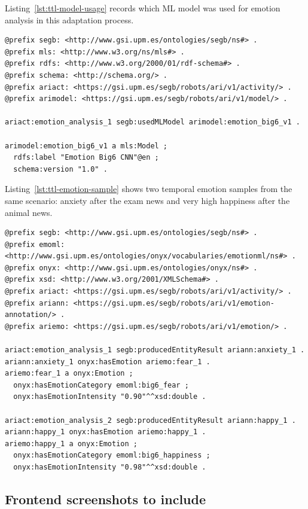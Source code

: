 \documentclass[preprint,12pt, a4paper]{elsarticle}
\begin{document}
Listing~\ref{lst:ttl-model-usage} records which \ac{ML} model was used for emotion analysis in this adaptation process.

\begin{lstlisting}[style=ttl,caption={ML model usage for emotional adaptation},label={lst:ttl-model-usage}]
@prefix segb: <http://www.gsi.upm.es/ontologies/segb/ns#> .
@prefix mls: <http://www.w3.org/ns/mls#> .
@prefix rdfs: <http://www.w3.org/2000/01/rdf-schema#> .
@prefix schema: <http://schema.org/> .
@prefix ariact: <https://gsi.upm.es/segb/robots/ari/v1/activity/> .
@prefix arimodel: <https://gsi.upm.es/segb/robots/ari/v1/model/> .

ariact:emotion_analysis_1 segb:usedMLModel arimodel:emotion_big6_v1 .

arimodel:emotion_big6_v1 a mls:Model ;
  rdfs:label "Emotion Big6 CNN"@en ;
  schema:version "1.0" .
\end{lstlisting}

Listing~\ref{lst:ttl-emotion-sample} shows two temporal emotion samples from the same scenario: anxiety after the exam news and very high happiness after the animal news.

\begin{lstlisting}[style=ttl,caption={Temporal emotion samples: anxiety to very high happiness},label={lst:ttl-emotion-sample}]
@prefix segb: <http://www.gsi.upm.es/ontologies/segb/ns#> .
@prefix emoml: <http://www.gsi.upm.es/ontologies/onyx/vocabularies/emotionml/ns#> .
@prefix onyx: <http://www.gsi.upm.es/ontologies/onyx/ns#> .
@prefix xsd: <http://www.w3.org/2001/XMLSchema#> .
@prefix ariact: <https://gsi.upm.es/segb/robots/ari/v1/activity/> .
@prefix ariann: <https://gsi.upm.es/segb/robots/ari/v1/emotion-annotation/> .
@prefix ariemo: <https://gsi.upm.es/segb/robots/ari/v1/emotion/> .

ariact:emotion_analysis_1 segb:producedEntityResult ariann:anxiety_1 .
ariann:anxiety_1 onyx:hasEmotion ariemo:fear_1 .
ariemo:fear_1 a onyx:Emotion ;
  onyx:hasEmotionCategory emoml:big6_fear ;
  onyx:hasEmotionIntensity "0.90"^^xsd:double .

ariact:emotion_analysis_2 segb:producedEntityResult ariann:happy_1 .
ariann:happy_1 onyx:hasEmotion ariemo:happy_1 .
ariemo:happy_1 a onyx:Emotion ;
  onyx:hasEmotionCategory emoml:big6_happiness ;
  onyx:hasEmotionIntensity "0.98"^^xsd:double .
\end{lstlisting}

\subsection{Frontend screenshots to include}
\end{document}
